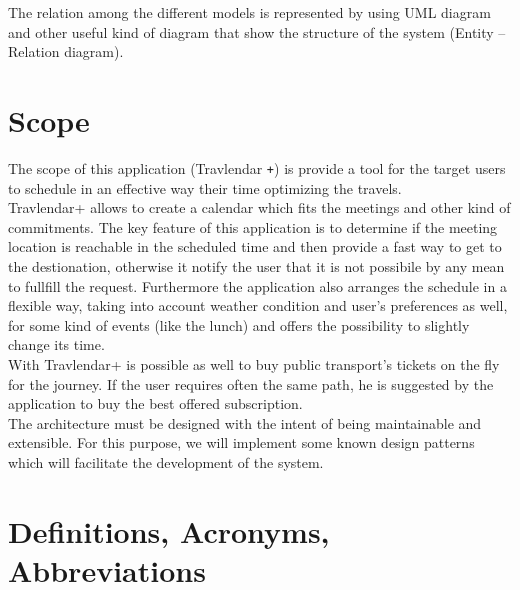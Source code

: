 \documentclass[numbers=noenddot, 12pt, a4paper, oneside]{scrbook}
\def\Plus{\texttt{+}}
\begin{document}
The relation among the different models is represented by using UML diagram and other useful
kind of diagram that show the structure of the system (Entity – Relation diagram).



\section{Scope}

The scope of this application (Travlendar \Plus) is provide a tool for the target users to schedule in an effective way their time optimizing the travels.\\

Travlendar+ allows to create a calendar which fits the meetings and other kind of commitments.
The key feature of this application is to determine if the meeting location is reachable in the scheduled time and then provide a fast way to get to the destionation, otherwise it notify the user that it is not possibile by any mean to fullfill the request. Furthermore the application also arranges the schedule in a flexible way, taking into account weather condition and user's preferences as well, for some kind of events (like the lunch) and offers the possibility to slightly change its time.\\

With Travlendar+ is possible as well to buy public transport's tickets on the fly for the journey. If the user requires often the same path, he is suggested by the application to buy the best offered subscription.\\

The architecture must be designed with the intent of being maintainable and extensible. For this purpose, we will implement some known design patterns which will facilitate the development of the system.



\section{Definitions, Acronyms, Abbreviations}
\end{document}
